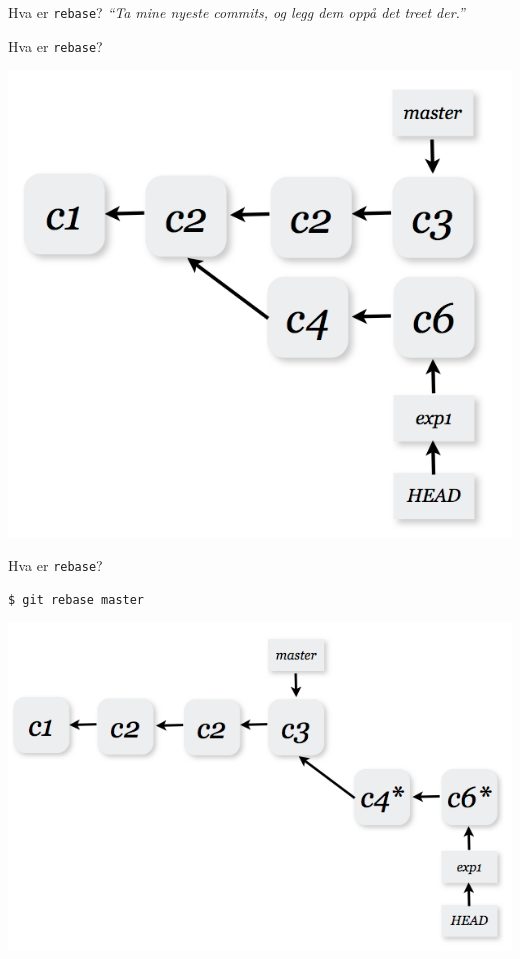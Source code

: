 \documentclass{beamer}
\begin{document}
\begin{frame}{Hva er \texttt{rebase}?}
    \emph{``Ta mine nyeste commits, og legg dem oppå det treet der.''}
\end{frame}

\begin{frame}{Hva er \texttt{rebase}?}
    \begin{center}
        \includegraphics[scale=0.3]{3.png}
    \end{center}
\end{frame}

\begin{frame}[fragile]{Hva er \texttt{rebase}?}
    \begin{lstlisting}[language=bash]
      $ git rebase master
    \end{lstlisting}
    \pause
    \begin{center}
        \includegraphics[scale=0.3]{4.png}\\
    \end{center}
\end{frame}
\end{document}

